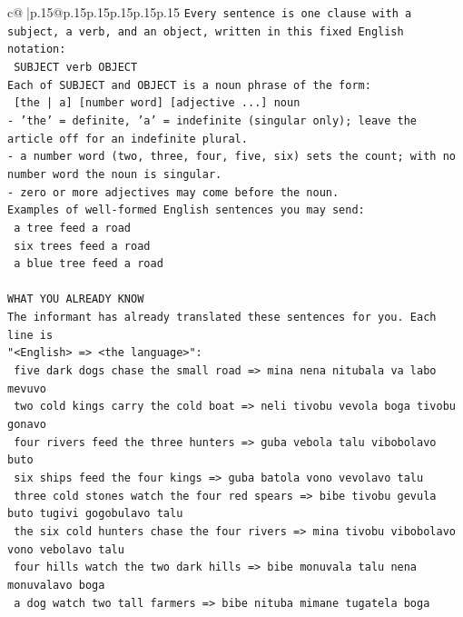 \documentclass{article}
\begin{document}
{\begin{supertabular}{c@{$\;$}|p{.15\linewidth}@{}p{.15\linewidth}p{.15\linewidth}p{.15\linewidth}p{.15\linewidth}p{.15\linewidth}}
{{{\texttt{Every sentence is one clause with a subject, a verb, and an object, written in this fixed English notation:} \\
\texttt{    SUBJECT  verb  OBJECT} \\
\texttt{Each of SUBJECT and OBJECT is a noun phrase of the form:} \\
\texttt{    {[}the | a{]}  {[}number word{]}  {[}adjective ...{]}  noun} \\
\texttt{{-} 'the' = definite, 'a' = indefinite (singular only); leave the article off for an indefinite plural.} \\
\texttt{{-} a number word (two, three, four, five, six) sets the count; with no number word the noun is singular.} \\
\texttt{{-} zero or more adjectives may come before the noun.} \\
\texttt{Examples of well{-}formed English sentences you may send:} \\
\texttt{    a tree feed a road} \\
\texttt{    six trees feed a road} \\
\texttt{    a blue tree feed a road} \\
\\ 
\texttt{WHAT YOU ALREADY KNOW} \\
\texttt{The informant has already translated these sentences for you. Each line is} \\
\texttt{"<English>  =>  <the language>":} \\
\texttt{    five dark dogs chase the small road  =>  mina nena nitubala va labo mevuvo} \\
\texttt{    two cold kings carry the cold boat  =>  neli tivobu vevola boga tivobu gonavo} \\
\texttt{    four rivers feed the three hunters  =>  guba vebola talu vibobolavo buto} \\
\texttt{    six ships feed the four kings  =>  guba batola vono vevolavo talu} \\
\texttt{    three cold stones watch the four red spears  =>  bibe tivobu gevula buto tugivi gogobulavo talu} \\
\texttt{    the six cold hunters chase the four rivers  =>  mina tivobu vibobolavo vono vebolavo talu} \\
\texttt{    four hills watch the two dark hills  =>  bibe monuvala talu nena monuvalavo boga} \\
\texttt{    a dog watch two tall farmers  =>  bibe nituba mimane tugatela boga} \\
}}}
\end{supertabular}}
\end{document}
